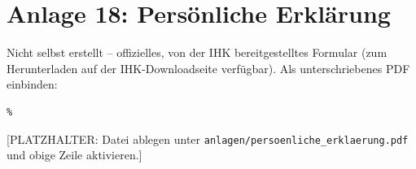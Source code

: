 \section*{Anlage 18: Pers\"onliche Erkl\"arung}
\label{anh:persoenliche_erklaerung}
Nicht selbst erstellt -- offizielles, von der IHK bereitgestelltes Formular
(zum Herunterladen auf der IHK-Downloadseite verf\"ugbar). Als
unterschriebenes PDF einbinden:
\begin{verbatim}
% 
\end{verbatim}
[PLATZHALTER: Datei ablegen unter \texttt{anlagen/persoenliche\_erklaerung.pdf}
und obige Zeile aktivieren.]
